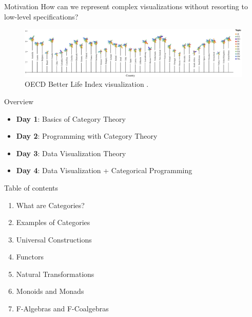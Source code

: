 \documentclass[aspectratio=169,xcolor=dvipsnames,10pt]{beamer}
\theoremstyle{definition}
\begin{document}
\begin{frame}[fragile]{Motivation}
    How can we represent complex visualizations without resorting to low-level specifications?
	\vspace{3mm}
	\begin{figure}[H]
		\begin{center}
			\includegraphics[width=1.\textwidth]{./figs/moritz.pdf}
		\end{center}
        \caption{OECD Better Life Index visualization \citet{oecd}.}
		\label{fig:rotated-histogram}
	\end{figure}
\end{frame}

\begin{frame}[fragile]{Overview}
    \begin{itemize}
        \item \textbf{Day 1}: Basics of Category Theory
        \item \textbf{Day 2}: Programming with Category Theory
        \item \textbf{Day 3}: Data Visualization Theory
        \item \textbf{Day 4}: Data Visualization + Categorical Programming
    \end{itemize}
\end{frame}

\begin{frame}{Table of contents}
    \begin{enumerate}
        \item What are Categories?
        \item Examples of Categories
        \item Universal Constructions
        \item Functors
        \item Natural Transformations
        \item Monoids and Monads
        \item F-Algebras and F-Coalgebras
    \end{enumerate}
\end{frame}
\end{document}
